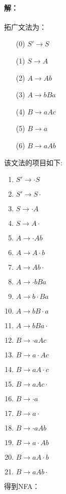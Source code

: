 \paragraph{解：}
拓广文法为：
\begin{center}
	\begin{enumerate}
		\item[(0)] $S' \to S$
		\item[(1)] $S \to A$ 
		\item[(2)] $A \to Ab$
		\item[(3)] $A \to bBa$
		\item[(4)] $B \to aAc$
		\item[(5)] $B \to a$
		\item[(6)] $B \to aAb$
	\end{enumerate}
\end{center}
该文法的项目如下:
\begin{center}
	\begin{enumerate}
		\item $S' \to \cdot S$
		\item $S' \to S \cdot$
		\item $S \to \cdot A$
		\item $S \to A \cdot$
		\item $A \to \cdot Ab$
		\item $A \to A \cdot b$
		\item $A \to Ab \cdot$
		\item $A \to \cdot bBa$
		\item $A \to b \cdot Ba$
		\item $A \to bB \cdot a$
		\item $A \to bBa \cdot$
		\item $B \to \cdot aAc$
		\item $B \to a \cdot Ac$
		\item $B \to aA \cdot c$
		\item $B \to aAc \cdot$
		\item $B \to \cdot a$
		\item $B \to a \cdot$
		\item $B \to \cdot aAb$
		\item $B \to a \cdot Ab$
		\item $B \to aA \cdot b$
		\item $B \to aAb \cdot$
	\end{enumerate}
\end{center}
得到NFA：
